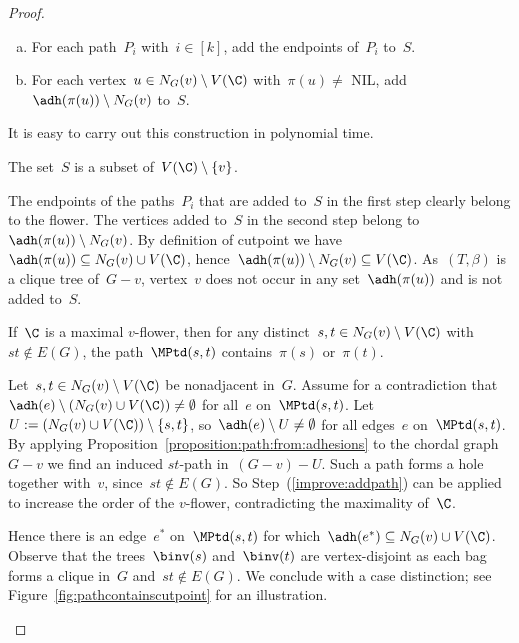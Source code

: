\begin{proof}
\begin{enumerate}[(a)]
	\item For each path~$P_i$ with~$i \in [k]$, add the endpoints of~$P_i$ to~$S$.\label{hittingset:endpoints}
	\item For each vertex~$u \in N_G(v) \setminus V(\C)$ with~$\pi(u) \neq$ NIL, add~$\adh(\pi(u)) \setminus N_G(v)$ to~$S$.\label{hittingset:cutpoint}
\end{enumerate}

It is easy to carry out this construction in polynomial time.

\begin{claim} \label{claim:s:subset:flower}
The set~$S$ is a subset of~$V(\C) \setminus \{v\}$.
\end{claim}
\begin{claimproof}
The endpoints of the paths~$P_i$ that are added to~$S$ in the first step clearly belong to the flower. The vertices added to~$S$ in the second step belong to~$\adh(\pi(u)) \setminus N_G(v)$. By definition of cutpoint we have~$\adh(\pi(u)) \subseteq N_G(v) \cup V(\C)$, hence~$\adh(\pi(u)) \setminus N_G(v) \subseteq V(\C)$. As~$(T,\beta)$ is a clique tree of~$G - v$, vertex~$v$ does not occur in any set~$\adh(\pi(u))$ and is not added to~$S$.
\end{claimproof}

\begin{claim} \label{claim:saturated:edge}
If~$\C$ is a maximal $v$-flower, then for any distinct~$s, t \in N_G(v) \setminus V(\C)$ with~$st \not \in E(G)$, the path~$\MPtd(s,t)$ contains~$\pi(s)$ or~$\pi(t)$.
\end{claim}
\begin{claimproof}
Let~$s,t \in N_G(v) \setminus V(\C)$ be nonadjacent in~$G$. Assume for a contradiction that~$\adh(e) \setminus (N_G(v) \cup V(\C)) \neq \emptyset$ for all~$e$ on~$\MPtd(s,t)$. Let~$U := (N_G(v) \cup V(\C)) \setminus \{s,t\}$, so~$\adh(e) \setminus U \neq \emptyset$ for all edges~$e$ on~$\MPtd(s,t)$. By applying Proposition~\ref{proposition:path:from:adhesions} to the chordal graph~$G - v$ we find an induced $st$-path in~$(G - v) - U$. Such a path forms a hole together with~$v$, since~$st \not \in E(G)$. So Step~(\ref{improve:addpath}) can be applied to increase the order of the $v$-flower,  contradicting the maximality of~$\C$.

Hence there is an edge~$e^*$ on~$\MPtd(s,t)$ for which~$\adh(e^*) \subseteq N_G(v) \cup V(\C)$. Observe that the trees~$\binv(s)$ and~$\binv(t)$ are vertex-disjoint as each bag forms a clique in~$G$ and~$st \not \in E(G)$. We conclude with a case distinction; see Figure~\ref{fig:pathcontainscutpoint} for an illustration.


\end{claimproof}
\end{proof}

